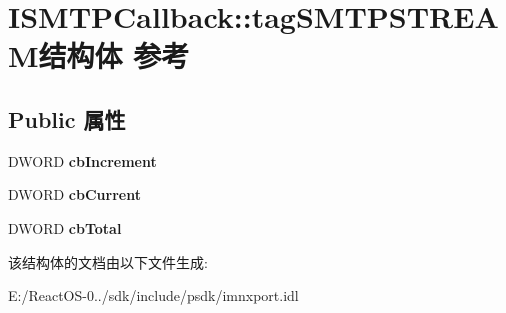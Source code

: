 \hypertarget{struct_i_s_m_t_p_callback_1_1tag_s_m_t_p_s_t_r_e_a_m}{}\section{I\+S\+M\+T\+P\+Callback\+:\+:tag\+S\+M\+T\+P\+S\+T\+R\+E\+A\+M结构体 参考}
\label{struct_i_s_m_t_p_callback_1_1tag_s_m_t_p_s_t_r_e_a_m}
\subsection*{Public 属性}
\begin{DoxyCompactItemize}
\item 
\mbox{\label{struct_i_s_m_t_p_callback_1_1tag_s_m_t_p_s_t_r_e_a_m_af658868ceb1c38e61b138e66174591f5}} 
D\+W\+O\+RD {\bfseries cb\+Increment}
\item 
\mbox{\label{struct_i_s_m_t_p_callback_1_1tag_s_m_t_p_s_t_r_e_a_m_aa260584ce2b0e99a3e2b1b641b08a7d4}} 
D\+W\+O\+RD {\bfseries cb\+Current}
\item 
\mbox{\label{struct_i_s_m_t_p_callback_1_1tag_s_m_t_p_s_t_r_e_a_m_a32d26cf7b334d8d12f07c34c24583b02}} 
D\+W\+O\+RD {\bfseries cb\+Total}
\end{DoxyCompactItemize}


该结构体的文档由以下文件生成\+:\begin{DoxyCompactItemize}
\item 
E\+:/\+React\+O\+S-\/0../sdk/include/psdk/imnxport.\+idl\end{DoxyCompactItemize}
